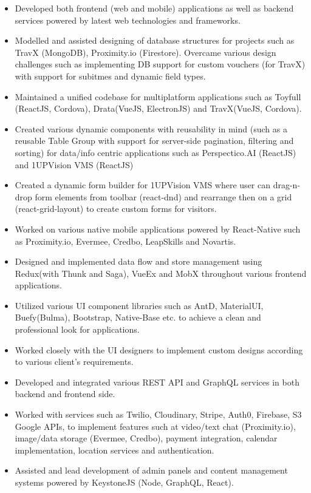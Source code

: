 \documentclass[10pt,a4paper,ragged2e]{maltacv}
\begin{document}
\begin{itemize}
  \item Developed both frontend (web and mobile) applications as well as backend services powered by latest web technologies and frameworks.
  \item Modelled and assisted designing of database structures for projects such as TravX (MongoDB), Proximity.io (Firestore). Overcame various design challenges such as implementing DB support for custom vouchers (for TravX) with support for subitmes and dynamic field types. 
  \item Maintained a unified codebase for multiplatform applications such as Toyfull (ReactJS, Cordova), Drata(VueJS, ElectronJS) and TravX(VueJS, Cordova).
  \item Created various dynamic components with reusability in mind (such as a reusable Table Group with support for server-side pagination, filtering and sorting) for data/info centric applications such as Perspectico.AI (ReactJS) and 1UPVision VMS (ReactJS)
  \item Created a dynamic form builder for 1UPVision VMS where user can drag-n-drop form elements from toolbar (react-dnd) and rearrange then on a grid (react-grid-layout) to create custom forms for visitors.
  \item Worked on various native mobile applications powered by React-Native such as Proximity.io, Evermee, Credbo, LeapSkills and Novartis. 
  \item Designed and implemented data flow and store management using Redux(with Thunk and Saga), VueEx and MobX throughout various frontend applications.
  \item Utilized various UI component libraries such as AntD, MaterialUI, Buefy(Bulma), Bootstrap, Native-Base etc. to achieve a clean and professional look for applications. 
  \item Worked closely with the UI designers to implement custom designs according to various client's requirements.
  \item Developed and integrated various REST API and GraphQL services in both backend and frontend side.
  \item Worked with services such as Twilio, Cloudinary, Stripe, Auth0, Firebase, S3 Google APIs, to implement features such at video/text chat (Proximity.io), image/data storage (Evermee, Credbo), payment integration, calendar implementation, location services and authentication.  
  \item Assisted and lead development of admin panels and content management systems powered by KeystoneJS (Node, GraphQL, React).
\end{itemize}
\end{document}
